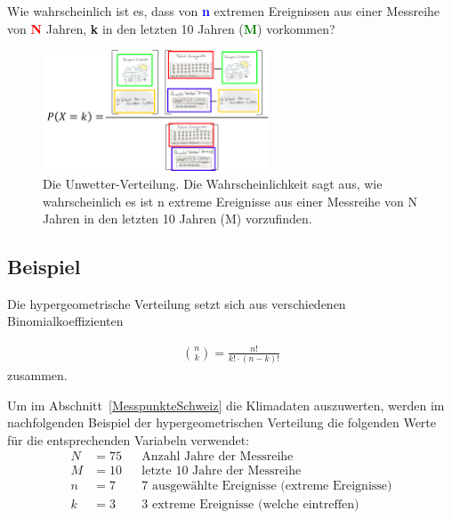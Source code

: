 \begin{refsection}
\begin{frage}
Wie wahrscheinlich
ist es, dass von \textcolor{blue}{\textbf{n}} extremen Ereignissen
aus einer Messreihe von \textcolor{red}{\textbf{N}} Jahren,
\textcolor{darkyellow}{\textbf{k}}
in den
letzten 10 Jahren (\textcolor{green}{\textbf{M}}) vorkommen?
\end{frage}

\begin{figure}
\centering
\includegraphics[width=0.6\textwidth]{extrem/Unwettervert.pdf}
\caption{Die Unwetter-Verteilung. Die Wahrscheinlichkeit sagt aus, wie wahrscheinlich es ist n extreme Ereignisse aus einer Messreihe von N Jahren in den letzten 10 Jahren (M) vorzufinden.}
\label{UnwetterVerteilung}
\end{figure}


\subsection{Beispiel} \label{Beispiel}
Die hypergeometrische Verteilung setzt sich aus verschiedenen Binomialkoeffizienten

\begin{align*}
\binom{n}{k} = \frac {n!}{k! \cdot (n-k)!} 
\end{align*}
zusammen.

Um im Abschnitt~\ref{MesspunkteSchweiz} die Klimadaten auszuwerten, werden im nachfolgenden Beispiel der hypergeometrischen Verteilung die folgenden Werte für die entsprechenden Variabeln verwendet:
\begin{align*}
N&=75&&\text{Anzahl Jahre der Messreihe}\\
M&=10&&\text{letzte 10 Jahre der Messreihe}\\
n&=7&&\text{7 ausgewählte Ereignisse (extreme Ereignisse)}\\
k&=3&&\text{3 extreme Ereignisse (welche eintreffen)}
\end{align*}


\end{refsection}
